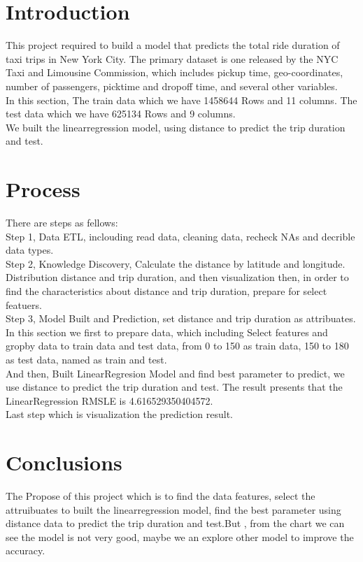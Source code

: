 \section{Introduction}\label{sec-intro}

This project required to build a model that predicts the total ride duration of taxi trips in New York City. The primary dataset is one released by the NYC Taxi and Limousine Commission, which includes pickup time, geo-coordinates, number of passengers, picktime and dropoff time, and several other variables.
\\In this section, The train data which we have 1458644 Rows and 11 columns. The test data which we have 625134 Rows and 9 columns.
\\We built the linearregression model, using distance to predict the trip duration and test.

\section{Process} 

There are steps as fellows:
\\Step 1, Data ETL, inclouding read data, cleaning data, recheck NAs and decrible data types.
\\Step 2, Knowledge Discovery, Calculate the distance by latitude and longitude. Distribution distance and trip duration, and then visualization then, in order to find the characteristics about distance and trip duration, prepare for select featuers.
\\Step 3, Model Built and Prediction, set distance and trip duration as attribuates. In this section we first to prepare data, which including Select features and gropby data to train data and test data, from 0 to 150 as train data, 150 to 180 as test data, named as train and test.
\\And then, Built LinearRegresion Model and find best parameter to predict, we use distance to predict the trip duration and test. The result presents that the LinearRegression RMSLE is  4.616529350404572. 
\\Last step which is visualization the prediction result.


\section{Conclusions} \label{sec-conclusions}

The Propose of this project which is to find the data features, select the attruibuates to built the linearregression model, find the best parameter using distance data to predict the trip duration and test.But , from the chart we can see the model is not very good, maybe we an explore other model to improve the accuracy.




